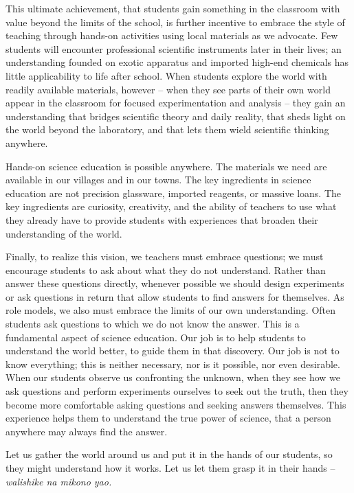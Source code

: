 This ultimate achievement, 
that students gain something in the classroom with 
value beyond the limits of the school, 
is further incentive to embrace the style 
of teaching through hands-on activities using local materials 
as we advocate. 
Few students will encounter professional scientific instruments 
later in their lives; 
an understanding founded on exotic apparatus and 
imported high-end chemicals has little applicability to life after school. 
When students explore the world with readily available materials, 
however -- 
when they see parts of their own world appear in the classroom 
for focused experimentation and analysis -- 
they gain an understanding that bridges scientific theory and 
daily reality, 
that sheds light on the world beyond the laboratory, 
and that lets them wield scientific thinking anywhere.

Hands-on science education is possible anywhere. 
The materials we need are available in our villages and in our towns. 
The key ingredients in science education are not precision glassware, 
imported reagents, or massive loans. 
The key ingredients are curiosity, creativity, 
and the ability of teachers to use what they already have 
to provide students with experiences 
that broaden their understanding of the world.

Finally, to realize this vision, 
we teachers must embrace questions; 
we must encourage students to ask about what they do not understand. 
Rather than answer these questions directly, 
whenever possible we should design experiments 
or ask questions in return that allow students 
to find answers for themselves. 
As role models, we also must embrace the limits of our own understanding. 
Often students ask questions to which we do not know the answer. 
This is a fundamental aspect of science education. 
Our job is to help students to understand the world better, 
to guide them in that discovery. 
Our job is not to know everything; this is neither necessary, 
nor is it possible, nor even desirable. 
When our students observe us confronting the unknown, 
when they see how we ask questions and 
perform experiments ourselves to seek out the truth, 
then they become more comfortable asking questions 
and seeking answers themselves. 
This experience helps them to understand the true power of science, 
that a person anywhere may always find the answer.

Let us gather the world around us and 
put it in the hands of our students, 
so they might understand how it works. 
Let us let them grasp it in their hands -- 
\textit{walishike na mikono yao.}
